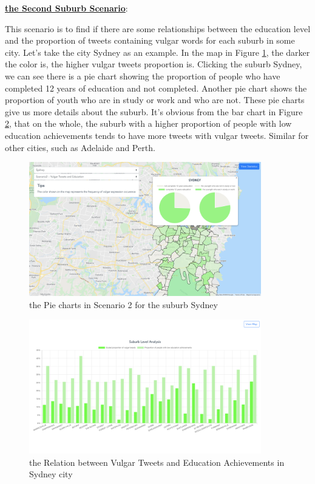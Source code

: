 \documentclass{article}
\begin{document}
\textbf{\underline{the Second Suburb Scenario}}: 

This scenario is to find if there are some relationships between the education level and the proportion of tweets containing vulgar words for each suburb in some city. Let’s take the city Sydney as an example. In the map in Figure
\ref{fig:Sydney_pie_chart}, the darker the color is, the higher vulgar tweets proportion is. Clicking the suburb Sydney, we can see there is a pie chart showing the proportion of people who have completed 12 years of education and not completed. Another pie chart shows the proportion of youth who are in study or work and who are not. These pie charts give us more details about the suburb. It’s obvious from the bar chart in Figure
\ref{fig:Sydney_histogram}, that on the whole, the suburb with a higher proportion of people with low education achievements tends to have more tweets with vulgar tweets. Similar for other cities, such as Adelaide and Perth.

\begin{figure}[htp]
\centering
\includegraphics[width=0.9\textwidth]{img/Sydney_pie_chart.jpg}
\caption{the Pie charts in Scenario 2 for the suburb Sydney}
\label{fig:Sydney_pie_chart}
\end{figure}

\begin{figure}[htp]
\centering
\includegraphics[width=0.9\textwidth]{img/Sydney_histogram.jpg}
\caption{the Relation between Vulgar Tweets and Education Achievements in Sydney city}
\label{fig:Sydney_histogram}
\end{figure}
\end{document}
